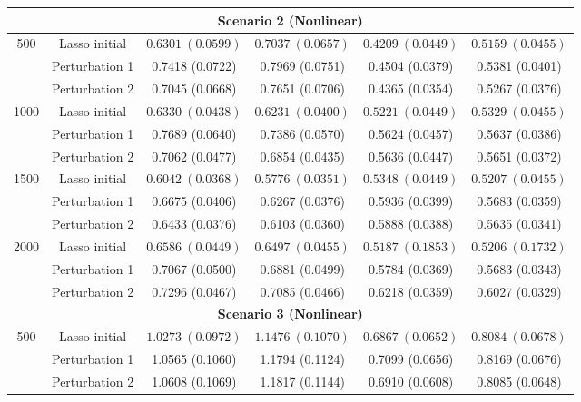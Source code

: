 \documentclass[12pt]{article}
\begin{document}
\begin{table}[!ht]
\begin{tabular}{cccccc}
        \hline
         \multicolumn{6}{c}{\textbf{Scenario 2 (Nonlinear)}}\\
        \hline
        \multirow{3}{*}{500} 
        & Lasso initial & $0.6301\ (0.0599)$  & $0.7037\ (0.0657)$ & $0.4209\ (0.0449) $ & $0.5159\ (0.0455)$ \\ 
        & Perturbation 1 & 0.7418 (0.0722)  & 0.7969 (0.0751) & 0.4504 (0.0379)  & 0.5381 (0.0401) \\ 
        & Perturbation 2  & 0.7045 (0.0668) & 0.7651 (0.0706) & 0.4365 (0.0354)  & 0.5267 (0.0376) \\
        \hline
        \multirow{3}{*}{1000} 
        & Lasso initial & $0.6330\ (0.0438)$  & $0.6231\ (0.0400)$ & $0.5221\ (0.0449)$ & $0.5329\ (0.0455)$ \\ 
        & Perturbation 1 & 0.7689 (0.0640) & 0.7386 (0.0570)& 0.5624 (0.0457)  & 0.5637 (0.0386) \\ 
        & Perturbation 2 & 0.7062 (0.0477)  & 0.6854 (0.0435) & 0.5636 (0.0447)  & 0.5651 (0.0372) \\
        \hline
        \multirow{3}{*}{1500} 
        & Lasso initial & $0.6042\ (0.0368) $  & $0.5776\ (0.0351)$ & $0.5348\ (0.0449)$ & $0.5207\ (0.0455)$ \\ 
        & Perturbation 1  & 0.6675 (0.0406)& 0.6267 (0.0376) & 0.5936 (0.0399) & 0.5683 (0.0359) \\
        & Perturbation 2    & 0.6433 (0.0376)  & 0.6103 (0.0360)& 0.5888 (0.0388) & 0.5635 (0.0341) \\
        \hline
        \multirow{3}{*}{2000} 
        & Lasso initial & $0.6586\ (0.0449)$  & $0.6497\ (0.0455)$ & $0.5187\ (0.1853)$ & $0.5206\ (0.1732)$ \\ 
        & Perturbation 1 & 0.7067 (0.0500) & 0.6881 (0.0499) & 0.5784 (0.0369) & 0.5683 (0.0343) \\ 
        & Perturbation 2    & 0.7296 (0.0467)  & 0.7085 (0.0466) & 0.6218 (0.0359) & 0.6027 (0.0329) \\
        \hline 
         \multicolumn{6}{c}{\textbf{Scenario 3 (Nonlinear)}}\\
        \hline
       \multirow{3}{*}{500} 
        & Lasso initial & $1.0273\ (0.0972)$  & $1.1476\ (0.1070)$ & $0.6867\ (0.0652)$ & $0.8084\ (0.0678)$ \\ 
        & Perturbation 1 & 1.0565 (0.1060)  & 1.1794 (0.1124) & 0.7099 (0.0656)  & 0.8169 (0.0676) \\ 
        & Perturbation 2  & 1.0608 (0.1069) & 1.1817 (0.1144)& 0.6910 (0.0608) & 0.8085 (0.0648) \\

\end{tabular}
\end{table}
\end{document}
